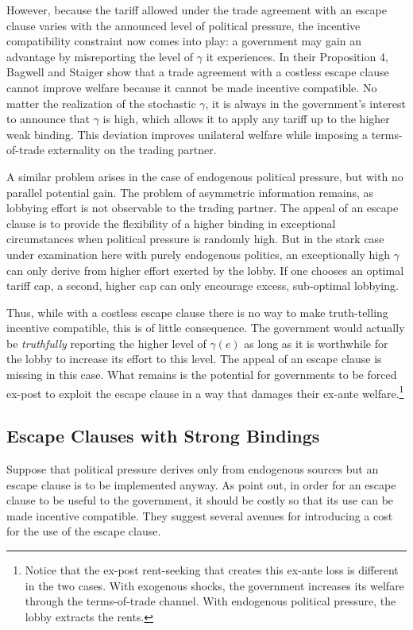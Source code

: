 \documentclass[12pt]{article}
\newcommand{\ga}{\gamma}
\begin{document}
However, because the tariff allowed under the trade agreement with an escape clause varies with the announced level of political pressure, the incentive compatibility constraint now comes into play: a government may gain an advantage by misreporting the level of $\ga$ it experiences. In their Proposition 4, Bagwell and Staiger show that a trade agreement with a costless escape clause cannot improve welfare because it cannot be made incentive compatible. No matter the realization of the stochastic $\ga$, it is always in the government's interest to announce that $\ga$ is high, which allows it to apply any tariff up to the higher weak binding. This deviation improves unilateral welfare while imposing a terms-of-trade externality on the trading partner.

A similar problem arises in the case of endogenous political pressure, but with no parallel potential gain. The problem of asymmetric information remains, as lobbying effort is not observable to the trading partner. The appeal of an escape clause is to provide the flexibility of a higher binding in exceptional circumstances when political pressure is randomly high. But in the stark case under examination here with purely endogenous politics, an exceptionally high $\ga$ can only derive from higher effort exerted by the lobby. If one chooses an optimal tariff cap, a second, higher cap can only encourage excess, sub-optimal lobbying.

Thus, while with a costless escape clause there is no way to make truth-telling incentive compatible, this is of little consequence. The government would actually be \textit{truthfully} reporting the higher level of $\ga(e)$ as long as it is worthwhile for the lobby to increase its effort to this level. The appeal of an escape clause is missing in this case. What remains is the potential for governments to be forced ex-post to exploit the escape clause in a way that damages their ex-ante welfare.\footnote{Notice that the ex-post rent-seeking that creates this ex-ante loss is different in the two cases. With exogenous shocks, the government increases its welfare through the terms-of-trade channel. With endogenous political pressure, the lobby extracts the rents.}

\subsection{Escape Clauses with Strong Bindings}
Suppose that political pressure derives only from endogenous sources but an escape clause is to be implemented anyway. As \Textcite{bs2005} point out, in order for an escape clause to be useful to the government, it should be costly so that its use can be made incentive compatible. They suggest several avenues for introducing a cost for the use of the escape clause.
\end{document}
